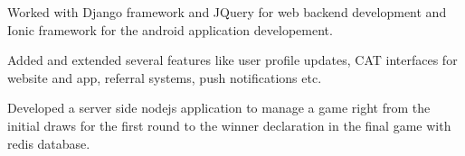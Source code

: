 \documentclass[letterpaper]{deedy-resume} %
\begin{document}
\begin{minipage}[t]{0.66\textwidth}
\begin{tightitemize}
\item Worked with Django framework and JQuery for web backend development and Ionic framework for the android application developement.
\item Added and extended several features like user profile updates, CAT interfaces for website and app, referral systems, push notifications etc.
\end{tightitemize}



\begin{tightitemize}
\item Developed a server side nodejs application to manage a game right from the initial draws for the first round to the winner declaration in the final game with redis database.
\end{tightitemize}

\sectionspace %

\vspace{\topsep} %

\end{minipage}
\end{document}
